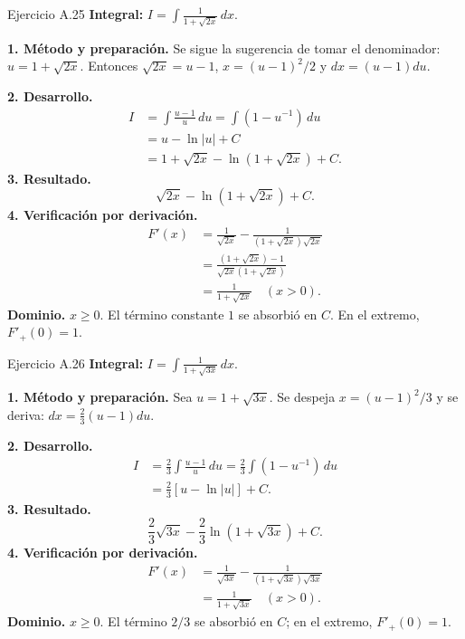 \begin{examplebox}{Ejercicio A.25}
\textbf{Integral:} $\displaystyle I=\int \frac1{1+\sqrt{2x}}\,dx$.

\textbf{1. Método y preparación.} Se sigue la sugerencia de tomar el denominador: $u=1+\sqrt{2x}$. Entonces $\sqrt{2x}=u-1$, $x=(u-1)^2/2$ y $dx=(u-1)du$.

\textbf{2. Desarrollo.}
\begin{align*}
I&=\int\frac{u-1}{u}\,du=\int(1-u^{-1})\,du\\&=u-\ln|u|+C\\&=1+\sqrt{2x}-\ln(1+\sqrt{2x})+C.
\end{align*}
\textbf{3. Resultado.}
\[
\sqrt{2x}-\ln(1+\sqrt{2x})+C.
\]
\textbf{4. Verificación por derivación.}
\begin{align*}
F'(x)&=\frac1{\sqrt{2x}}-\frac1{(1+\sqrt{2x})\sqrt{2x}}\\&=\frac{(1+\sqrt{2x})-1}{\sqrt{2x}(1+\sqrt{2x})}\\&=\frac1{1+\sqrt{2x}}\quad(x>0).
\end{align*}
\textbf{Dominio.} $x\ge0$. El término constante $1$ se absorbió en $C$. En el extremo, $F'_+(0)=1$.
\end{examplebox}

\begin{examplebox}{Ejercicio A.26}
\textbf{Integral:} $\displaystyle I=\int \frac1{1+\sqrt{3x}}\,dx$.

\textbf{1. Método y preparación.} Sea $u=1+\sqrt{3x}$. Se despeja $x=(u-1)^2/3$ y se deriva: $dx=\tfrac23(u-1)du$.

\textbf{2. Desarrollo.}
\begin{align*}
I&=\frac23\int\frac{u-1}{u}\,du=\frac23\int(1-u^{-1})\,du\\&=\frac23[u-\ln|u|]+C.
\end{align*}
\textbf{3. Resultado.}
\[
\frac23\sqrt{3x}-\frac23\ln(1+\sqrt{3x})+C.
\]
\textbf{4. Verificación por derivación.}
\begin{align*}
F'(x)&=\frac1{\sqrt{3x}}-\frac1{(1+\sqrt{3x})\sqrt{3x}}\\&=\frac1{1+\sqrt{3x}}\quad(x>0).
\end{align*}
\textbf{Dominio.} $x\ge0$. El término $2/3$ se absorbió en $C$; en el extremo, $F'_+(0)=1$.
\end{examplebox}

